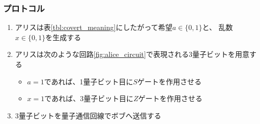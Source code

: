 \begin{frame}
  \frametitle{プロトコル}

  \pause
  \begin{enumerate}
    \item<+-> アリスは表\ref{tbl:covert_meaning}にしたがって希望$a \in \{0, 1\}$と、
    乱数$x \in \{0, 1\}$を生成する

    \item<+-> アリスは次のような回路\ref{fig:alice_circuit}で表現される3量子ビットを用意する
    \begin{itemize}
      \item $a = 1$であれば、1量子ビット目に$S$ゲートを作用させる
      \item $x = 1$であれば、3量子ビット目に$Z$ゲートを作用させる
    \end{itemize}
    \label{enum:alice_s_z_gate}

    \item<+-> 3量子ビットを量子通信回線でボブへ送信する
  \end{enumerate}

\end{frame}


